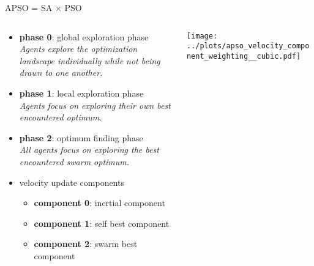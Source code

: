 \documentclass[11pt,aspectratio=169]{beamer}
\begin{document}
%
%

\begin{frame}[fragile]{APSO = SA $\times$ PSO}
    \begin{columns}
    \begin{column}{0.5\textwidth}

        \begin{itemize}
            \item \textbf{phase 0}: global exploration phase\\
                {\scriptsize{\textit{Agents explore the optimization landscape individually while not being drawn to one another.}}}
            \item \textbf{phase 1}: local exploration phase\\
                {\scriptsize{\textit{Agents focus on exploring their own best encountered optimum.}}}

            \item \textbf{phase 2}: optimum finding phase\\
                {\scriptsize{\textit{All agents focus on exploring the best encountered swarm optimum.}}}
            \smallskip
            \item velocity update components
            \begin{itemize}
                \item \textbf{component 0}: inertial component
                \item \textbf{component 1}: self best component
                \item \textbf{component 2}: swarm best component
            \end{itemize}
        \end{itemize}
    \end{column}

    \begin{column}{0.45\textwidth}
        \texttt{[image: ../plots/apso\_velocity\_component\_weighting\_\_cubic.pdf]}
    \end{column}
    \end{columns}
\end{frame}
\end{document}
